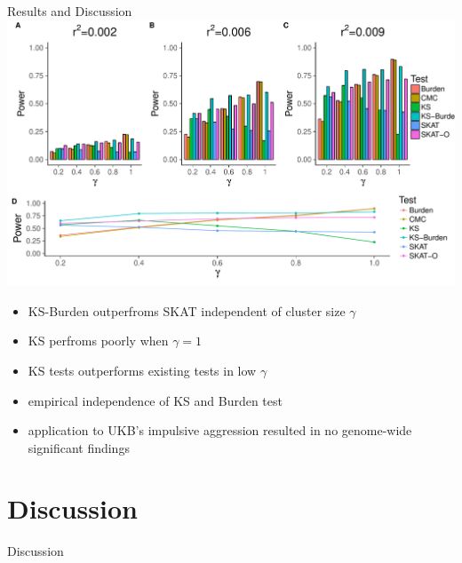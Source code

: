 \documentclass{beamer}
\begin{document}
  \begin{frame}[t]{Results and Discussion}
    \tiny
    \includegraphics[width=0.8\linewidth]{../ksburden/figures/combined_power_analysis.pdf}
    \begin{itemize}
      \item KS-Burden outperfroms SKAT independent of cluster size $\gamma$
      \item KS perfroms poorly when $\gamma=1$
      \item KS tests outperforms existing tests in low $\gamma$
      \item empirical independence of KS and Burden test
      \item application to UKB's impulsive aggression resulted in no genome-wide significant findings
    \end{itemize}
  \end{frame}

  \section{Discussion}

  \begin{frame}[t]{Discussion}

  \end{frame}



  
  
\end{document}
